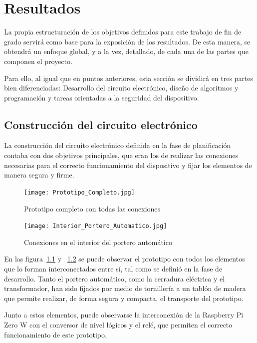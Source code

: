 \chapter{Resultados}
\label{ch:resultados}

La propia estructuración de los objetivos definidos para este trabajo de fin de grado servirá como base para la exposición de los resultados. De esta manera, se obtendrá un enfoque global, y a la vez, detallado, de cada una de las partes que componen el proyecto.

Para ello, al igual que en puntos anteriores, esta sección se dividirá en tres partes bien diferenciadas: Desarrollo del circuito electrónico, diseño de algoritmos y programación y tareas orientadas a la seguridad del dispositivo.
\section{Construcción del circuito electrónico}

La construcción del circuito electrónico definida en la fase de planificación contaba con dos objetivos principales, que eran los de realizar las conexiones necesarias para el correcto funcionamiento del dispositivo y fijar los elementos de manera segura y firme.

\begin{figure}[tbp]
\centering
\texttt{[image: Prototipo\_Completo.jpg]}
\caption{Prototipo completo con todas las conexiones}
\label{fig:prototipo-completo}
\end{figure}
\begin{figure}[tbp]
\centering
\texttt{[image: Interior\_Portero\_Automatico.jpg]}
\caption{Conexiones en el interior del portero automático}
\label{fig:interior-portero-automatico}
\end{figure}

En las figura~\ref{fig:prototipo-completo} y ~\ref{fig:interior-portero-automatico} se puede observar el prototipo con todos los elementos que lo forman interconectados entre sí, tal como se definió en la fase de desarrollo. Tanto el portero automático, como la cerradura eléctrica y el transformador, han sido fijados por medio de tornillería a un tablón de madera que permite realizar, de forma segura y compacta, el transporte del prototipo.

Junto a estos elementos, puede observarse la interconexión de la Raspberry Pi Zero W con el conversor de nivel lógicos y el relé, que permiten el correcto funcionamiento de este prototipo.

